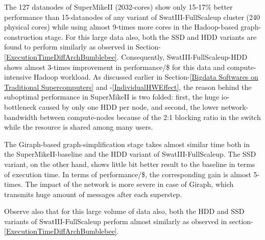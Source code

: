 \documentclass[conference]{IEEEtran}
\begin{document}
\begin{inparaenum}[\itshape 1\upshape)]
\item The 127 datanodes of SuperMikeII (2032-cores) show only 15-17\% better performance than 15-datanodes of any variant of SwatIII-FullScaleup cluster (240 physical cores) while using almost 9-times more cores in the Hadoop-based graph-construction stage. For this large data also, both the SSD and HDD variants are found to perform similarly as observed in Section-\ref{ExecutionTimeDiffArchBumblebee}. Consequently, SwatIII-FullScaleup-HDD shows almost 3-times improvement in performance/\$ for this data and compute-intensive Hadoop workload. 
As discussed earlier in Section-\ref{Bigdata Softwares on Traditional Supercomputers} and -\ref{IndividualHWEffect}, the reason behind the suboptimal performance in SuperMikeII is two folded: first, the huge io-bottleneck caused by only one HDD per node, and second, the lower network-bandwidth between compute-nodes because of the 2:1 blocking ratio in the switch while the resource is shared among many users.
\item The Giraph-based graph-simplification stage takes almost similar time both in the SuperMikeII-baseline and the HDD variant of SwatIII-FullScaleup. The SSD variant, on the other hand, shows little bit better result to the baseline in terms of execution time. In terms of performance/\$, the corresponding gain is almost 5-times. 
The impact of the network is more severe in case of Giraph, which transmits huge amount of messages after each superstep. 
\item Observe also that for this large volume of data also, both the HDD and SSD variants of SwatIII-FullScaleup perform almost similarly as observed in section-\ref{ExecutionTimeDiffArchBumblebee}.
\end{inparaenum}
\end{document}
